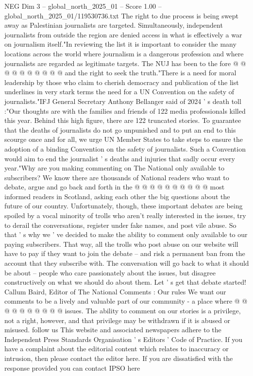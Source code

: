 \begin{textsample}{NEG Dim 3 – global\_north\_2025\_01 – Score 1.00 – global\_north\_2025\_01/119530736.txt}
The right to due process is being swept away as Palestinian journalists are targeted.
Simultaneously, independent journalists from outside the region are denied access in what is effectively a war on journalism itself."In reviewing the list it is important to consider the many locations across the world where journalism is a dangerous profession and where journalists are regarded as legitimate targets.
The NUJ has been to the fore @ @ @ @ @ @ @ @ @ @ and the right to seek the truth."There is a need for moral leadership by those who claim to cherish democracy and publication of the list underlines in very stark terms the need for a UN Convention on the safety of journalists."IFJ General Secretary Anthony Bellanger said of 2024 ' s death toll :"Our thoughts are with the families and friends of 122 media professionals killed this year.
Behind this high figure, there are 122 truncated stories.
To guarantee that the deaths of journalists do not go unpunished and to put an end to this scourge once and for all, we urge UN Member States to take steps to ensure the adoption of a binding Convention on the safety of journalists.
Such a Convention would aim to end the journalist ' s deaths and injuries that sadly occur every year."Why are you making commenting on The National only available to subscribers?
We know there are thousands of National readers who want to debate, argue and go back and forth in the @ @ @ @ @ @ @ @ @ @ most informed readers in Scotland, asking each other the big questions about the future of our country.
Unfortunately, though, these important debates are being spoiled by a vocal minority of trolls who aren't really interested in the issues, try to derail the conversations, register under fake names, and post vile abuse.
So that ' s why we ' ve decided to make the ability to comment only available to our paying subscribers.
That way, all the trolls who post abuse on our website will have to pay if they want to join the debate -- and risk a permanent ban from the account that they subscribe with.
The conversation will go back to what it should be about -- people who care passionately about the issues, but disagree constructively on what we should do about them.
Let ' s get that debate started!
Callum Baird, Editor of The National Comments : Our rules We want our comments to be a lively and valuable part of our community - a place where @ @ @ @ @ @ @ @ @ @ issues.
The ability to comment on our stories is a privilege, not a right, however, and that privilege may be withdrawn if it is abused or misused. follow us This website and associated newspapers adhere to the Independent Press Standards Organisation ' s Editors ' Code of Practice.
If you have a complaint about the editorial content which relates to inaccuracy or intrusion, then please contact the editor here.
If you are dissatisfied with the response provided you can contact IPSO here

\end{textsample}
